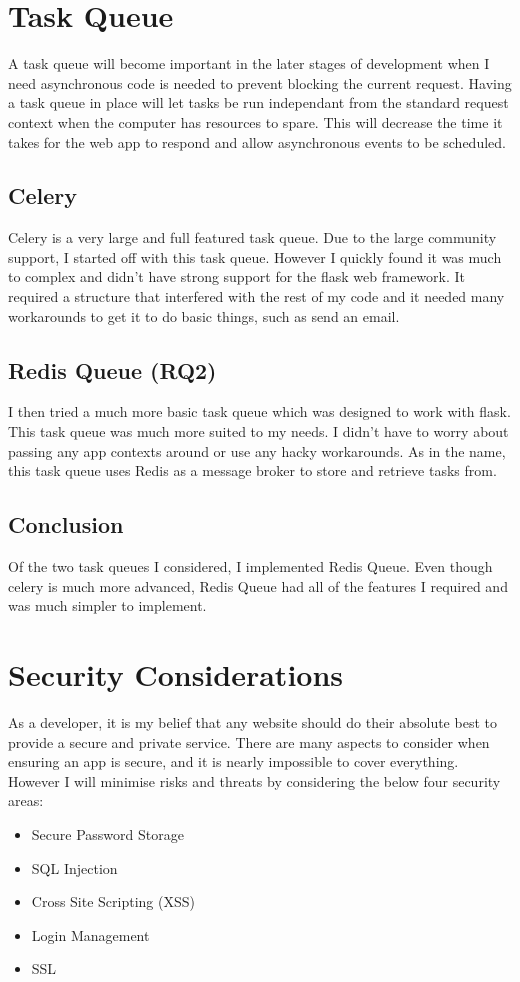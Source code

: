 \documentclass[a4paper,oneside,12pt]{report}
\begin{document}
	\section{Task Queue}
	A task queue will become important in the later stages of development when I need asynchronous code is needed to prevent blocking the current request. Having a task queue in place will let tasks be run independant from the standard request context when the computer has resources to spare. This will decrease the time it takes for the web app to respond and allow asynchronous events to be scheduled.

	\subsection{Celery}
	Celery is a very large and full featured task queue. Due to the large community support, I started off with this task queue.
	However I quickly found it was much to complex and didn't have strong support for the flask web framework. It required a structure that
	interfered with the rest of my code and it needed many workarounds to get it to do basic things, such as send an email.

	\subsection{Redis Queue (RQ2)}
	I then tried a much more basic task queue which was designed to work with flask. This task queue was much more suited to my needs.
	I didn't have to worry about passing any app contexts around or use any hacky workarounds. As in the name, this task queue uses Redis as a message broker to store and retrieve tasks from.

	\subsection{Conclusion}
	Of the two task queues I considered, I implemented Redis Queue. Even though celery is much more advanced, Redis Queue had all of the features I required and was much simpler to implement.	
	
	\section{Security Considerations}
	As a developer, it is my belief that any website should do their absolute best to provide a secure and private service. There are many aspects to consider when ensuring an app is secure, and it is nearly impossible to cover everything. However I will minimise risks and threats by considering the below four security areas:
	\begin{itemize}
		\item Secure Password Storage
		\item SQL Injection
		\item Cross Site Scripting (XSS)
		\item Login Management
		\item SSL
	\end{itemize}
\end{document}
